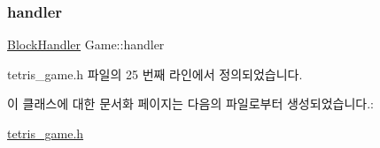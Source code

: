 \subsubsection{\texorpdfstring{handler}{handler}}
{\footnotesize\ttfamily \mbox{\hyperlink{class_block_handler}{Block\+Handler}} Game\+::handler\hspace{0.3cm}{\ttfamily [private]}}



tetris\+\_\+game.\+h 파일의 25 번째 라인에서 정의되었습니다.



이 클래스에 대한 문서화 페이지는 다음의 파일로부터 생성되었습니다.\+:\begin{DoxyCompactItemize}
\item 
\mbox{\hyperlink{tetris__game_8h}{tetris\+\_\+game.\+h}}\end{DoxyCompactItemize}
